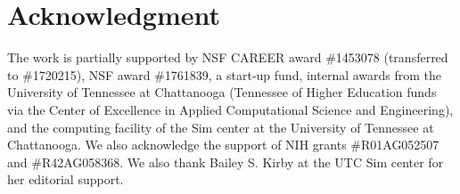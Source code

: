 \documentclass[conference]{IEEEtran}
\begin{document}

\section*{Acknowledgment}

The work is partially supported by NSF CAREER award \#1453078 (transferred to \#1720215), NSF award \#1761839, a  start-up fund, internal awards from the University of Tennessee at Chattanooga (Tennessee of Higher Education funds via the Center of Excellence in Applied Computational Science and Engineering), and the computing facility of the Sim center at the University of Tennessee at Chattanooga. We also acknowledge the support of NIH grants \#R01AG052507 and \#R42AG058368. We also thank Bailey S. Kirby at the UTC Sim center for her editorial support.
\end{document}
